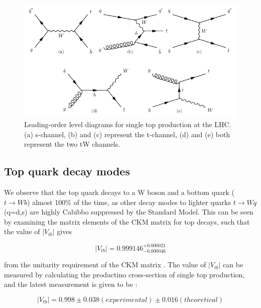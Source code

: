 \begin{figure} \label{fig-singletopProductionLHC}
\begin{center}
\includegraphics[width=\textwidth]{Figures/singletopProductionLHC.png}
\caption{Leading-order level diagrams for single top production at the LHC. {(a)} s-channel, {(b)} and {(c)} represent the t-channel, {(d)} and {(e)} both represent the two tW channels. \cite{SergeyThesis}}
\end{center}
\end{figure}

\subsection{Top quark decay modes} \label{subsec-TopDecayModes}

We observe that the top quark decays to a W boson and a bottom quark ($t \to Wb$) almost 100\% of the time, as other decay modes to lighter quarks $t \to Wq$ (q=d,s) are highly Cabibbo suppressed by the Standard Model. This can be seen by examining the matrix elements of the CKM matrix for top decays, such that the value of $|V_{tb}|$ gives

\begin{equation}
|V_{tb}| = 0.999146^{+0.000021}_{-0.000046}
\end{equation}

from the unitarity requirement of the CKM matrix \cite{PhysRevD.86.010001}. The value of $|V_{tb}|$ can be measured by calculating the productino cross-section of single top production, and the latest measurement is given to be \cite{Khachatryan:2014iya}:

\begin{equation}
|V_{tb}| = 0.998 \pm 0.038 (experimental) \pm 0.016 (theoretical)
\end{equation}

